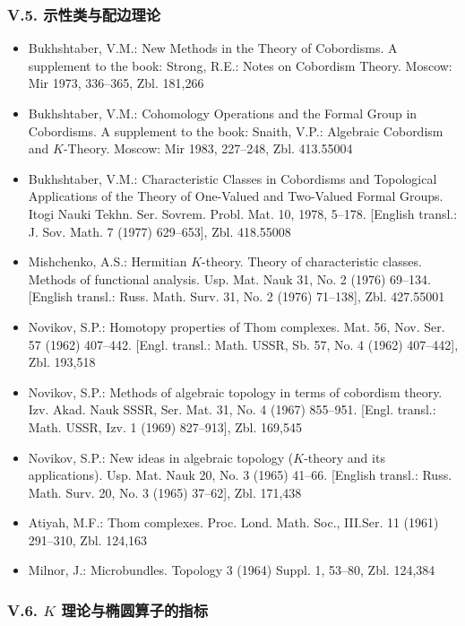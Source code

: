 \subsubsection*{V.5. 示性类与配边理论}

\begin{itemize}
\item Bukhshtaber, V.M.: New Methods in the Theory of Cobordisms. A supplement to the book: Strong, R.E.: Notes on Cobordism Theory. Moscow: Mir 1973, 336--365, Zbl. 181,266
\item Bukhshtaber, V.M.: Cohomology Operations and the Formal Group in Cobordisms. A supplement to the book: Snaith, V.P.: Algebraic Cobordism and $K$-Theory. Moscow: Mir 1983, 227--248, Zbl. 413.55004
\item Bukhshtaber, V.M.: Characteristic Classes in Cobordisms and Topological Applications of the Theory of One-Valued and Two-Valued Formal Groups. Itogi Nauki Tekhn. Ser. Sovrem. Probl. Mat. 10, 1978, 5--178. [English transl.: J. Sov. Math. 7 (1977) 629--653], Zbl. 418.55008
\item Mishchenko, A.S.: Hermitian $K$-theory. Theory of characteristic classes. Methods of functional analysis. Usp. Mat. Nauk 31, No. 2 (1976) 69--134. [English transl.: Russ. Math. Surv. 31, No. 2 (1976) 71--138], Zbl. 427.55001
\item Novikov, S.P.: Homotopy properties of Thom complexes. Mat. 56, Nov. Ser. 57 (1962) 407--442. [Engl. transl.: Math. USSR, Sb. 57, No. 4 (1962) 407--442], Zbl. 193,518
\item Novikov, S.P.: Methods of algebraic topology in terms of cobordism theory. Izv. Akad. Nauk SSSR, Ser. Mat. 31, No. 4 (1967) 855--951. [Engl. transl.: Math. USSR, Izv. 1 (1969) 827--913], Zbl. 169,545
\item Novikov, S.P.: New ideas in algebraic topology ($K$-theory and its applications). Usp. Mat. Nauk 20, No. 3 (1965) 41--66. [English transl.: Russ. Math. Surv. 20, No. 3 (1965) 37--62], Zbl. 171,438
\item Atiyah, M.F.: Thom complexes. Proc. Lond. Math. Soc., III.Ser. 11 (1961) 291--310, Zbl. 124,163
\item Milnor, J.: Microbundles. Topology 3 (1964) Suppl. 1, 53--80, Zbl. 124,384
\end{itemize}

\subsubsection*{V.6. $K$ 理论与椭圆算子的指标}

